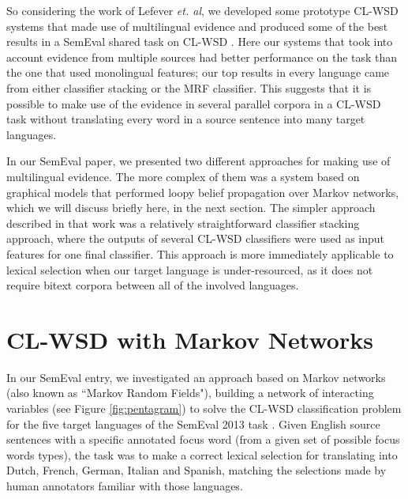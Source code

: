 So considering the work of Lefever \emph{et. al}, we developed some prototype
CL-WSD systems that made use of multilingual evidence
\cite{rudnick-liu-gasser:2013:SemEval-2013} and produced some of the best
results in a SemEval shared task on CL-WSD \cite{task10}.
Here our systems that took into account evidence from multiple sources had
better performance on the task than the one that used monolingual features; our
top results in every language came from either classifier stacking or the MRF
classifier. This suggests that it is possible to make use of the evidence in
several parallel corpora in a CL-WSD task without translating every word in a
source sentence into many target languages.

In our SemEval paper, we presented two different approaches for
making use of multilingual evidence. The more complex of them was a system
based on graphical models that performed loopy belief propagation over Markov
networks, which we will discuss briefly here, in the next section.
The simpler approach described in that work was a relatively straightforward
classifier stacking approach, where the outputs of several CL-WSD classifiers
were used as input features for one final classifier. This approach is more
immediately applicable to lexical selection when our target language is
under-resourced, as it does not require bitext corpora between all of the
involved languages.

\section{CL-WSD with Markov Networks}
In our SemEval entry, we investigated an approach based on Markov networks
(also known as ``Markov Random Fields"), building a network of interacting
variables (see Figure \ref{fig:pentagram}) to solve the CL-WSD classification
problem for the five target languages of the SemEval 2013 task \cite{task10}.
Given English source sentences with a specific annotated focus word (from a
given set of possible focus words types), the task was to make a correct
lexical selection for translating into Dutch, French, German, Italian and
Spanish, matching the selections made by human annotators familiar with those
languages.

